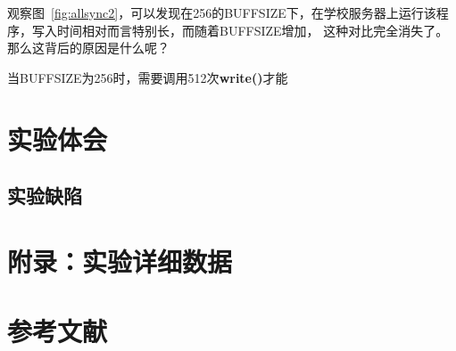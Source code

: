 \documentclass[a4paper,twoside]{article}
\begin{document}
\begin{spacing}{1.2}
观察图~\ref{fig:allsync2}，可以发现在256的BUFFSIZE下，在学校服务器上运行该程序，写入时间相对而言特别长，而随着BUFFSIZE增加，
这种对比完全消失了。那么这背后的原因是什么呢？

当BUFFSIZE为256时，需要调用512次\textbf{write()}才能 

\section{实验体会}

\subsection{实验缺陷}

\clearpage
\section*{附录：实验详细数据}
\label{sec:appendix}

\clearpage
\section*{参考文献}




\end{spacing}
\end{document}
